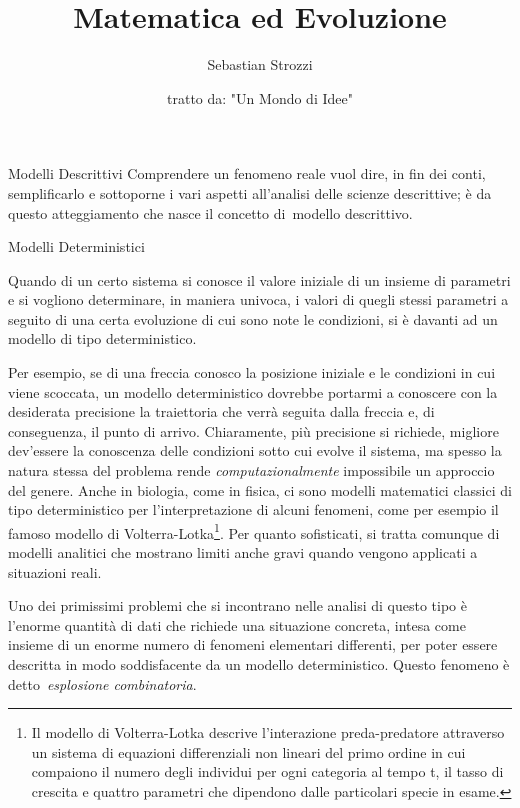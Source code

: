 \documentclass{article}
\title{Matematica ed Evoluzione}
\author{Sebastian Strozzi}
\date{tratto da: "Un Mondo di Idee"}
\begin{document}
	\maketitle
	\begin{section}{Modelli Descrittivi} 
		Comprendere un fenomeno reale vuol dire, in fin dei conti, semplificarlo e sottoporne i vari aspetti all’analisi delle scienze descrittive; è da questo atteggiamento che nasce il concetto di modello descrittivo.
		
		\begin{subsection}{Modelli Deterministici}
			
			Quando di un certo sistema si conosce il valore iniziale di un insieme di parametri e si vogliono determinare, in maniera univoca, i valori di quegli stessi parametri a seguito di una certa evoluzione di cui sono note le condizioni, si è davanti ad un modello di tipo deterministico.
			
			Per esempio, se di una freccia conosco la posizione iniziale e le condizioni in cui viene scoccata, un modello deterministico dovrebbe portarmi a conoscere con la desiderata precisione la traiettoria che verrà seguita dalla freccia e, di conseguenza, il punto di arrivo. 
			Chiaramente, più precisione si richiede, migliore dev'essere la conoscenza delle condizioni sotto cui evolve il sistema, ma spesso la natura stessa del problema rende \emph{computazionalmente} impossibile un approccio del genere.
			Anche in biologia, come in fisica, ci sono modelli matematici classici di tipo deterministico per l’interpretazione di alcuni fenomeni, come per esempio il famoso modello di Volterra-Lotka\footnote{Il modello di Volterra-Lotka descrive l’interazione preda-predatore attraverso un sistema di equazioni differenziali non lineari del primo ordine in cui compaiono il numero degli individui per ogni categoria al tempo t, il tasso di crescita e quattro parametri che dipendono dalle particolari specie in esame.}. 
			Per quanto sofisticati, si tratta comunque di modelli analitici che mostrano limiti anche gravi quando vengono applicati a situazioni reali.
				
			Uno dei primissimi problemi che si incontrano nelle analisi di questo tipo è l’enorme quantità di dati che richiede una situazione concreta, intesa come insieme di un enorme numero di fenomeni elementari differenti, per poter essere descritta in modo soddisfacente da un modello deterministico. Questo fenomeno è detto \emph{esplosione combinatoria}.
				

\end{subsection}
\end{section}
\end{document}
